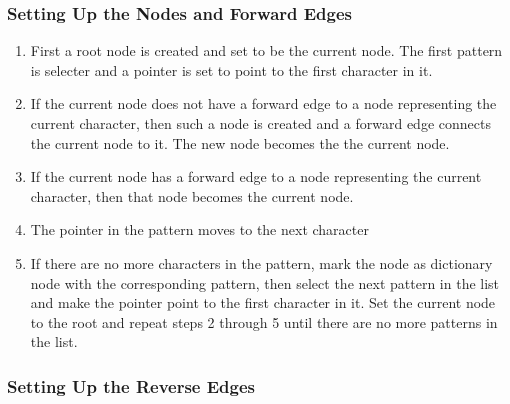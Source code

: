 \documentclass[paper=a4, fontsize=11pt]{scrartcl} %
\numberwithin{equation}{section} %
\numberwithin{figure}{section} %
\numberwithin{table}{section} %
\begin{document}
\subsubsection{Setting Up the Nodes and Forward Edges}
\begin{enumerate}

\item First a root node is created and set to be the current node. The first pattern is selecter and a pointer is set to point to the first character in it.

\item If the current node does not have a forward edge to a node representing the current character, then such a node is created and a forward edge connects the current node to it. The new node becomes the the current node.

\item If the current node has a forward edge to a node representing the current character, then that node becomes the current node.

\item The pointer in the pattern moves to the next character

\item If there are no more characters in the pattern, mark the node as dictionary node with the corresponding pattern, then select the next pattern in the list and make the pointer point to the first character in it. Set the current node to the root and repeat steps 2 through 5 until there are no more patterns in the list.
\end{enumerate}

\subsubsection{Setting Up the Reverse Edges}
\end{document}
